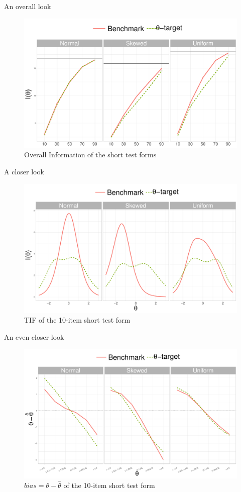 \documentclass{beamer} %
\begin{document}
\begin{frame}{An overall look}
\begin{figure}
	\centering
	\includegraphics[width=.90\linewidth]{img/info.pdf}
	\caption{Overall Information of the short test forms}
\end{figure}
\end{frame}

\begin{frame}{A closer look}
	\begin{figure}
		\centering
		\includegraphics[width=.90\linewidth]{img/infoDetails.pdf}
		\caption{TIF of the 10-item short test form}
	\end{figure}
\end{frame}

\begin{frame}{An even closer look}
	\begin{figure}
		\centering
		\includegraphics[width=.90\linewidth]{img/BIAS.pdf}
		\caption{$bias = \theta - \hat{\theta}$ of the 10-item short test form}
	\end{figure}
\end{frame}
\end{document}
